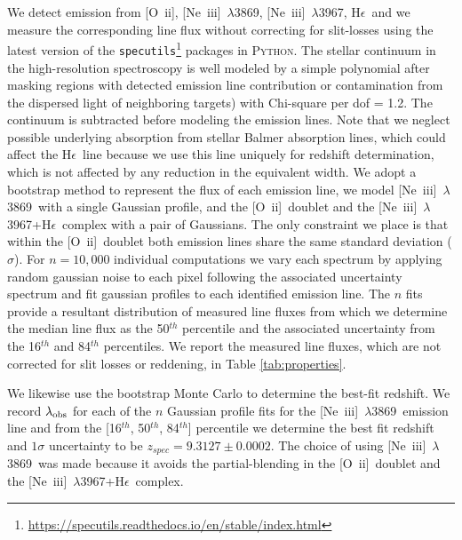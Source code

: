 \documentclass[sn-mathphys]{sn-jnl}%
\theoremstyle{thmstyleone}%
\theoremstyle{thmstyletwo}%
\theoremstyle{thmstylethree}%
\newcommand{\Oii}{[O~{\sc ii}]}
\newcommand{\Neiiia}{[Ne~{\sc iii}]~$\lambda$3869}
\newcommand{\Neiiib}{[Ne~{\sc iii}]~$\lambda$3967}
\newcommand{\He}{H$\epsilon$}
\begin{document}
We detect emission from \Oii, \Neiiia, \Neiiib, \He\ and we measure the corresponding line flux without correcting for slit-losses using the latest version of the \texttt{specutils}\footnote{\url{https://specutils.readthedocs.io/en/stable/index.html}} packages in \textsc{Python}. 
The stellar continuum in the high-resolution spectroscopy is well modeled by a simple polynomial after masking regions with detected emission line contribution or contamination from the dispersed light of neighboring targets) with Chi-square per dof = 1.2. The continuum is subtracted before modeling the emission lines. Note that we neglect possible underlying absorption from stellar Balmer absorption lines, which could affect the \He\ line because we use this line uniquely for redshift determination, which is not affected by any reduction in the equivalent width.
We adopt a bootstrap method to represent the flux of each emission line, we model \Neiiia\ with a single Gaussian profile, and the \Oii\ doublet and the \Neiiib+\He\ complex with a pair of Gaussians. The only constraint we place is that within the \Oii\ doublet both emission lines share the same standard deviation ($\sigma$). 
For $n=10,000$ individual computations we vary each spectrum by applying random gaussian noise to each pixel following the associated uncertainty spectrum and fit gaussian profiles to each identified emission line. 
The $n$ fits provide a resultant distribution of measured line fluxes from which we determine the median line flux as the 50$^{th}$ percentile and the associated uncertainty from the 16$^{th}$ and 84$^{th}$ percentiles.
We report the measured line fluxes, which are not corrected for slit losses or reddening, in Table \ref{tab:properties}.


We likewise use the bootstrap Monte Carlo to determine the best-fit redshift. We record $\lambda_{\rm obs}$ for each of the $n$ Gaussian profile fits for the \Neiiia\ emission line and from the [16$^{th}$, 50$^{th}$, 84$^{th}$] percentile we determine the best fit redshift and $1\sigma$ uncertainty to be $z_{spec}=9.3127\pm0.0002$. 
The choice of using \Neiiia\ was made because it avoids the partial-blending in the \Oii\ doublet and the \Neiiib+\He\ complex.
\end{document}

